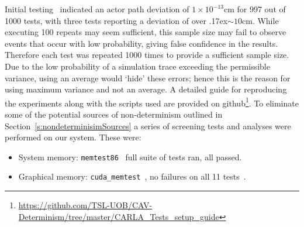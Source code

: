 Initial testing~\cite{TSLUnrealEngineTesting} indicated an actor path deviation of $1\times10^{-13}$cm for 997 out of 1000 tests, with three tests reporting a deviation of over {\raise.17ex\hbox{$\scriptstyle\sim$}}$10$cm. While executing 100 repeats may seem sufficient, this sample size may fail to observe events that occur with low probability, giving false confidence in the results. Therefore each test was repeated 1000 times to provide a sufficient sample size. 
%
Due to the low probability of a simulation trace exceeding the permissible variance, using an average would `hide' these errors; hence this is the reason for using maximum variance and not an average.
%
A detailed guide for reproducing the experiments along with the scripts used are provided on github\footnote{\url{https://github.com/TSL-UOB/CAV-Determinism/tree/master/CARLA_Tests_setup_guide}}. To eliminate some of the potential sources of non-determinism outlined in Section~\ref{s:nondeterminisimSources} a series of screening tests and analyses were performed on our system. These were:

\begin{itemize}[leftmargin=*]
    \item System memory: \texttt{memtest86}~\cite{MemTest86} full suite of tests ran, all passed.
    \item Graphical memory: \texttt{cuda\_memtest}~\cite{cuda_memtest}, no failures on all 11 tests~\cite{shi2009testing}.
\end{itemize}



